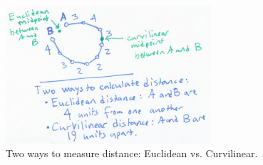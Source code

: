 \begin{figure}%
  \centering
  \includegraphics[width=3in]{img/distance-measures.png}
  \caption[Euclidean vs. Curvilinear Distance]{Two ways to measure
    distance: Euclidean vs. Curvilinear.}
  \label{fig:distance-measures}
\end{figure}
